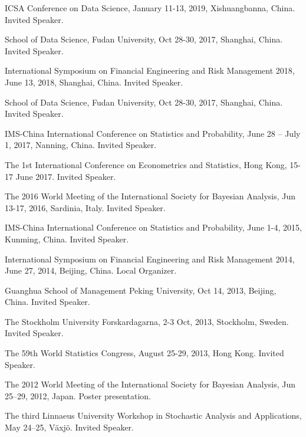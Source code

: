 \documentclass[twoside,a4paper]{article}
\begin{document}
\begin{etaremune}[itemsep=0ex,parsep=0pt]
\item ICSA Conference on Data Science, January 11-13, 2019, Xishuangbanna, China. Invited Speaker.

\item School of Data Science, Fudan University, Oct 28-30, 2017, Shanghai, China. Invited Speaker.

\item International Symposium on Financial Engineering and Risk Management 2018, June 13, 2018, Shanghai, China. Invited Speaker.

\item School of Data Science, Fudan University, Oct 28-30, 2017, Shanghai, China. Invited Speaker.

\item IMS-China International Conference on Statistics and Probability, June 28 – July 1, 2017, Nanning, China. Invited Speaker.

\item The 1st International Conference on Econometrics and Statistics, Hong Kong, 15-17 June 2017. Invited Speaker.

\item The 2016 World Meeting of the International Society for Bayesian Analysis, Jun 13-17, 2016, Sardinia, Italy. Invited Speaker.

\item IMS-China International Conference on Statistics and Probability, June 1-4, 2015, Kunming, China. Invited Speaker.

\item International Symposium on Financial Engineering and Risk Management 2014, June 27, 2014, Beijing, China. Local Organizer.

\item Guanghua School of Management Peking University, Oct 14, 2013, Beijing, China. Invited Speaker.

\item The Stockholm University Forskardagarna, 2-3 Oct, 2013, Stockholm, Sweden. Invited Speaker.

\item The 59th World Statistics Congress, August 25-29, 2013, Hong Kong. Invited Speaker.

\item The 2012 World Meeting of the International Society for Bayesian Analysis, Jun 25--29, 2012, Japan. Poster presentation.

\item The third Linnaeus University Workshop in Stochastic Analysis and Applications, May 24--25, Växjö. Invited Speaker.


\end{etaremune}
\end{document}
